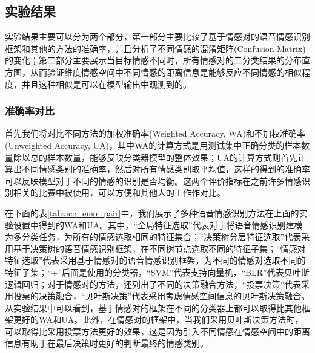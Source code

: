 \subsection{实验结果}
\label{ssec:experiment_result}

实验结果主要可以分为两个部分，第一部分主要比较了基于情感对的语音情感识别框架和其他的方法的准确率，并且分析了不同情感的混淆矩阵(Confusion Matrix)的变化；第二部分主要展示当目标情感不同时，所有情感对的二分类结果的分布直方图，从而验证维度情感空间中不同情感的距离信息是能够反应不同情感的相似程度，并且这种相似是可以在模型输出中观测到的。

\subsubsection{准确率对比}
\label{sssec:emo_pair_acc_compare}

首先我们将对比不同方法的加权准确率(Weighted Accuracy, WA)和不加权准确率(Unweighted Accuracy, UA)，其中WA的计算方式是用测试集中正确分类的样本数量除以总的样本数量，能够反映分类器模型的整体效果；UA的计算方式则首先计算出不同情感类别的准确率，然后对所有情感类别取平均值，这样的得到的准确率可以反映模型对于不同的情感的识别是否均衡。这两个评价指标在之前许多情感识别相关的比赛中被使用，可以方便和其他人的工作作对比。

在下面的表\ref{tab:acc_emo_pair}中，我们展示了多种语音情感识别方法在上面的实验设置中得到的WA和UA。其中，“全局特征选取”代表对于将语音情感识别建模为多分类任务，为所有的情感选取相同的特征集合；“决策树分层特征选取”代表采用基于决策树的语音情感识别框架，在不同树节点选取不同的特征子集；“情感对特征选取”代表采用基于情感对的语音情感识别框架，为不同的情感对选取不同的特征子集；“+”后面是使用的分类器，“SVM”代表支持向量机，“BLR”代表贝叶斯逻辑回归；对于情感对的方法，还列出了不同的决策融合方法，“投票决策”代表采用投票的决策融合，“贝叶斯决策”代表采用考虑情感空间信息的贝叶斯决策融合。从实验结果中可以看到，基于情感对的框架在不同的分类器上都可以取得比其他框架更好的WA和UA。此外，在情感对的框架中，当我们采用贝叶斯决策方法时，可以取得比采用投票方法更好的效果，这是因为引入不同情感在情感空间中的距离信息有助于在最后决策时更好的判断最终的情感类别。

